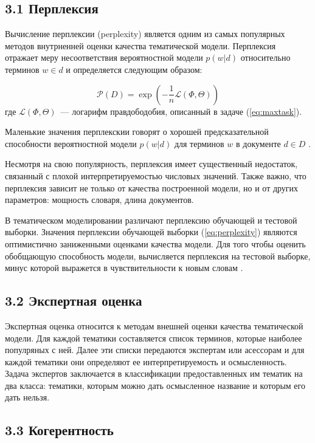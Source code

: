 \documentclass[a4paper]{report}
\begin{document}
	\subsection{3.1 Перплексия}
	
	Вычисление перплексии (perplexity) является одним из самых популярных методов внутрненней оценки качества тематической модели. Перплексия отражает меру несоответствия вероятностной модели $p(w|d)$ относительно терминов $w \in d$ и определяется следующим образом:
	
	\begin{equation}
		\mathcal{P}(D) = \exp \left( - \dfrac1n \mathcal{L}(\Phi, \Theta) \right)
	\label{eq:perplexity}
	\end{equation}
	где $\mathcal{L}(\Phi, \Theta)$~--- логарифм правдободобия, описанный в задаче (\ref{eq:maxtask}).
	
	Маленькие значения перплекскии говорят о хорошей предсказательной способности вероятностной модели $p(w|d)$ для терминов $w$ в документе $d \in D$ \cite{bib:Heinrich}.
	
	Несмотря на свою популярность, перплексия имеет существенный недостаток, связанный с плохой интерпретируемостью числовых значений. Также важно, что перплексия зависит не только от качества построенной модели, но и от других параметров: мощность словаря, длина документов.
	
	В тематическом моделировании различают перплексию обучающей и тестовой выборки.
	Значения перплексии обучающей выборки (\ref{eq:perplexity}) являются оптимистично заниженными оценками качества модели. 
	Для того чтобы оценить обобщающую способность модели, вычисляется перплексия на тестовой выборке, минус которой выражется в чувствительности к новым словам \cite{bib:Voron1}.
	
	\subsection{3.2 Экспертная оценка}
	Экспертная оценка относится к методам внешней оценки качества тематической модели. Для каждой тематики составляется список терминов, которые наиболее популряных с ней.  Далее эти списки передаются экспертам или асессорам и для каждой тематики они определяют ее интерпретируемость и осмысленность. Задача экспертов заключается в классификации предоставленных им тематик на два класса: тематики, которым можно дать осмысленное название и которым его дать нельзя.
	
	\subsection{3.3 Когерентность}
	
\end{document}
